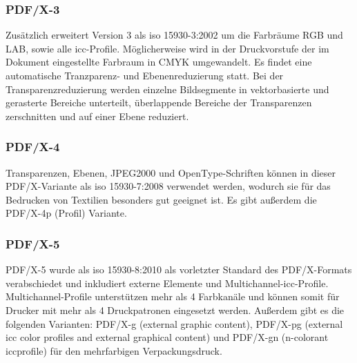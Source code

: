 \subsubsection{PDF/X-3}
Zusätzlich erweitert Version 3 als \gls{iso} 15930-3:2002 \cite{proj-consult} um die Farbräume RGB und LAB, sowie alle \gls{icc}-Profile. Möglicherweise wird in der Druckvorstufe der im Dokument eingestellte Farbraum in CMYK umgewandelt. Es findet eine automatische Tranzparenz- und Ebenenreduzierung statt. \cite{adobe-pdf-x} Bei der Transparenzreduzierung werden einzelne Bildsegmente in vektorbasierte und gerasterte Bereiche unterteilt, überlappende Bereiche der Transparenzen zerschnitten und auf einer Ebene reduziert. \cite{adobe-transp, primus}

\subsubsection{PDF/X-4}
Transparenzen, Ebenen, JPEG2000 und OpenType-Schriften können in dieser PDF/X-Variante als \gls{iso} 15930-7:2008 \cite{proj-consult, schneeberger} verwendet werden, wodurch sie für das Bedrucken von Textilien besonders gut geeignet ist. \cite{adobe-pdf-x} Es gibt außerdem die PDF/X-4p (Profil) Variante. \cite{schneeberger}

\subsubsection{PDF/X-5}
PDF/X-5 wurde als \gls{iso} 15930-8:2010 als vorletzter Standard des PDF/X-Formats verabschiedet und inkludiert externe Elemente und Multichannel-\gls{icc}-Profile. \cite{proj-consult} Multichannel-Profile unterstützen mehr als 4 Farbkanäle und können somit für Drucker mit mehr als 4 Druckpatronen eingesetzt werden. \cite{adobe-profil} Außerdem gibt es die folgenden Varianten: PDF/X-g (external graphic content), PDF/X-pg (external \gls{icc} color profiles and external graphical content) und PDF/X-gn (n-colorant \gls{icc}profile) für den mehrfarbigen Verpackungsdruck. \cite{schneeberger}

